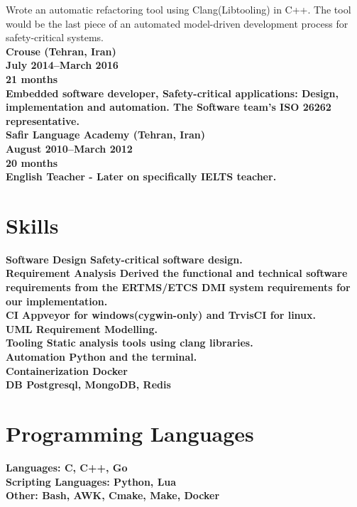 \documentclass[8pt]{article}
\begin{document}
\begin{multicols}{2}
  \normalfont Wrote an automatic refactoring tool using Clang(Libtooling) in C++. The tool would be the last piece of an automated model-driven development process for safety-critical systems.\\[5pt]
  \bf Crouse (Tehran, Iran)\\
  July 2014--March 2016\\
  21 months\\
  \normalfont Embedded software developer, Safety-critical applications: Design, implementation and automation. The Software team’s ISO 26262 representative.\\[5pt]
  \bf Safir Language Academy (Tehran, Iran)\\
  August 2010--March 2012\\
  20 months\\
  \normalfont English Teacher - Later on specifically IELTS teacher.\\[5pt]

  \section*{Skills}
  \bf Software Design \normalfont Safety-critical software design.\\[5pt]
  \bf Requirement Analysis \normalfont{} Derived the functional and technical software requirements from the ERTMS/ETCS DMI system requirements for our implementation.\\[5pt]
  \bf CI \normalfont Appveyor for windows(cygwin-only) and TrvisCI for linux.\\[5pt]
  \bf UML \normalfont Requirement Modelling.\\[5pt]
  \bf Tooling \normalfont Static analysis tools using clang libraries.\\[5pt]
  \bf Automation \normalfont Python and the terminal.\\[5pt]
  \bf Containerization \normalfont Docker\\[5pt]
  \bf DB \normalfont Postgresql, MongoDB, Redis\\[5pt]

  \section*{Programming Languages}
  \bf Languages: \normalfont C, C++, Go\\[5pt]
  \bf Scripting Languages: \normalfont Python, Lua\\[5pt]
  \bf Other: \normalfont Bash, AWK, Cmake, Make, Docker\\[5pt]


\end{multicols}
\end{document}
